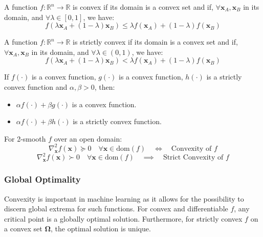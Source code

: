 \begin{definition}
  A function $f: \mathbb{R}^n \to \mathbb{R}$ is convex if its domain is a
  convex set and if, $\forall\mathbf{x}_A, \mathbf{x}_B$ in its domain, and
  $\forall\lambda \in [0, 1]$, we have:
  \[f(\lambda \mathbf{x}_A + (1 - \lambda)\mathbf{x}_B) \leq \lambda
  f(\mathbf{x}_A) + (1 - \lambda)f(\mathbf{x}_B)\]
\end{definition}
\begin{definition}
  A function $f: \mathbb{R}^n \to \mathbb{R}$ is strictly convex if its domain
  is a convex set and if, $\forall\mathbf{x}_A, \mathbf{x}_B$ in its domain,
  and $\forall\lambda \in (0, 1)$, we have:
  \[f(\lambda \mathbf{x}_A + (1 - \lambda)\mathbf{x}_B) < \lambda
  f(\mathbf{x}_A) + (1 - \lambda)f(\mathbf{x}_B)\]
\end{definition}
\begin{theorem}
   If $f(\cdot)$ is a convex function, $g(\cdot)$ is a convex function,
   $h(\cdot)$ is a strictly convex function and $\alpha,\beta>0$, then:
   \begin{itemize}
     \item $\alpha f(\cdot) + \beta g(\cdot)$ is a convex function.
     \item $\alpha f(\cdot) + \beta h(\cdot)$ is a strictly convex function.
   \end{itemize}
\end{theorem}
\begin{theorem}
  For 2-smooth $f$ over an open domain:
  \[\nabla_{\mathbf{x}}^2 f(\mathbf{x}) \succeq 0 \quad \forall \mathbf{x} \in
  \mbox{dom}(f)  \quad \iff \quad \mbox{Convexity of }f\]
  \[\nabla_{\mathbf{x}}^2 f(\mathbf{x}) \succ 0 \quad \forall \mathbf{x} \in \mbox{dom}(f)  \quad \implies \quad \mbox{Strict Convexity of }f\]
\end{theorem}
\subsubsection{Global Optimality}
Convexity is important in machine learning as it allows for the possibility to
discern global extrema for such functions. For convex and differentiable $f$,
any critical point is a globally optimal solution. Furthermore, for strictly
convex $f$ on a convex set $\boldsymbol{\Omega}$, the optimal solution is
unique.

